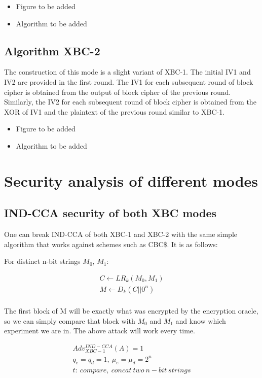 \documentclass[conference]{IEEEtran}
\begin{document}
\begin{itemize}
\color{red}
\item Figure to be added
\item Algorithm to be added
\end{itemize}

\subsection{Algorithm XBC-2}

The construction of this mode is a slight variant of XBC-1. The initial IV1 and IV2 are provided in the first round. The IV1 for each subsequent round of block cipher is obtained from the output of block cipher of the previous round. Similarly, the IV2 for each subsequent round of block cipher is obtained from the XOR of IV1 and the plaintext of the previous round similar to XBC-1.

\begin{itemize}
\color{red}
\item Figure to be added
\item Algorithm to be added
\end{itemize}

\section{Security analysis of different modes}

\subsection{IND-CCA security of both XBC modes}
One can break IND-CCA of both XBC-1 and XBC-2 with the same simple algorithm that works against schemes such as CBC\$. It is as follows:

For distinct n-bit strings $M_0$, $M_1$:

\begin{gather*}
  C \leftarrow LR_k (M_0, M_1) \\
  M \leftarrow D_k (C || 0^n) \\
\end{gather*}

The first block of M will be exactly what was encrypted by the encryption oracle, so we can simply compare that block with $M_0$ and $M_1$ and know which experiment we are in. The above attack will work every time.

\begin{gather*}
  Adv_{XBC-1}^{IND-CCA}(A) = 1 \\
  q_e=q_d=1,\ \mu_e = \mu_d = 2^n \\
  t:\ compare,\ concat\ two\ n-bit\ strings \\
\end{gather*}
\end{document}
